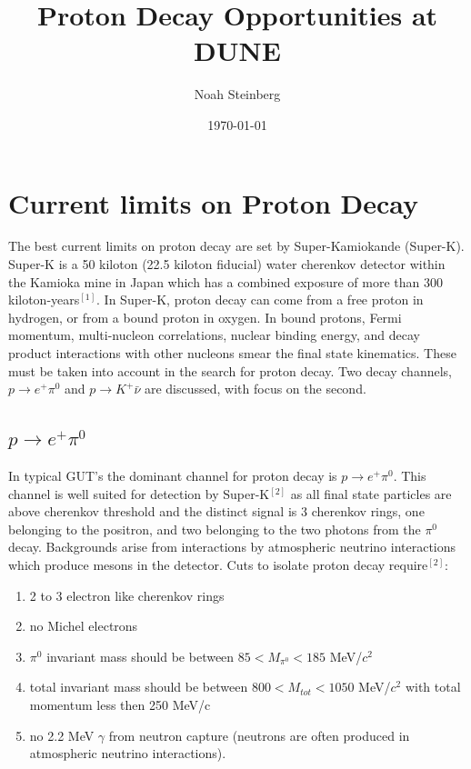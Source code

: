 \documentclass[aps,onecolumn,twoside,secnumarabic,balancelastpage,amsmath,amssymb,nofootinbib,hyperref=pdftex]{revtex4}
\begin{document}
\title{Proton Decay Opportunities at DUNE}
\author         {Noah Steinberg}
\date{\today}

\maketitle

\section{Current limits on Proton Decay}
The best current limits on proton decay are set by Super-Kamiokande (Super-K). Super-K is a 50 kiloton (22.5 kiloton fiducial) water cherenkov detector within the Kamioka mine in Japan which has a combined exposure of more than 300 kiloton-years$^{[1]}$. In Super-K, proton decay can come from a free proton in hydrogen, or from a bound proton in oxygen. In bound protons, Fermi momentum, multi-nucleon correlations, nuclear binding energy, and decay product interactions with other nucleons smear the final state kinematics. These must be taken into account in the search for proton decay. Two decay channels, $p \rightarrow e^{+}\pi^{0}$ and $p \rightarrow K^{+}\bar{\nu}$ are discussed, with focus on the second. 

\subsection{$p \rightarrow e^{+}\pi^{0}$}

In typical GUT's the dominant channel for proton decay is $p \rightarrow e^{+}\pi^{0}$. This channel is well suited for detection by Super-K$^{[2]}$ as all final state particles are above cherenkov threshold and the distinct signal is 3 cherenkov rings, one belonging to the positron, and two belonging to the two photons from the $\pi^{0}$ decay. Backgrounds arise from interactions by atmospheric neutrino interactions which produce mesons in the detector. Cuts to isolate proton decay require$^{[2]}$:

\begin{enumerate}
\item 2 to 3 electron like cherenkov rings
\item no Michel electrons
\item $\pi^{0}$ invariant mass should be between $85 < M_{\pi^{0}} < 185$ MeV/$c^{2}$
\item total invariant mass should be between $800 < M_{tot} < 1050$ MeV/$c^2$ with total momentum less then 250 MeV/c
\item no 2.2 MeV $\gamma$ from neutron capture (neutrons are often produced in atmospheric neutrino interactions).
\end{enumerate}
\end{document}
